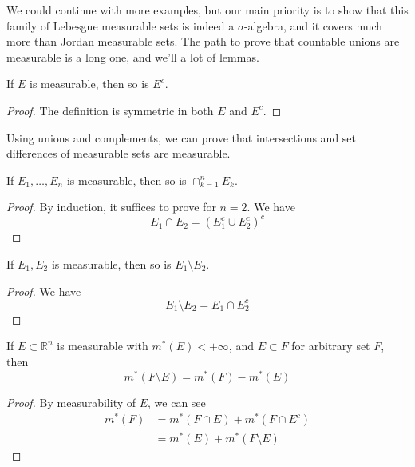   We could continue with more examples, but our main priority is to show that this family of Lebesgue measurable sets is indeed a $\sigma$-algebra, and it covers much more than Jordan measurable sets. The path to prove that countable unions are measurable is a long one, and we'll a lot of lemmas. 

  \begin{lemma}
    If $E$ is measurable, then so is $E^c$. 
  \end{lemma}
  \begin{proof}
    The definition is symmetric in both $E$ and $E^c$. 
  \end{proof}

  Using unions and complements, we can prove that intersections and set differences of measurable sets are measurable.  

  \begin{lemma}
    If $E_1, \ldots, E_n$ is measurable, then so is $\cap_{k=1}^n E_k$. 
  \end{lemma}
  \begin{proof}
    By induction, it suffices to prove for $n = 2$. We have 
    \begin{equation}
      E_1 \cap E_2 = (E_1^c \cup E_2^c)^c
    \end{equation}
  \end{proof}

  \begin{lemma}
    If $E_1, E_2$ is measurable, then so is $E_1 \setminus E_2$. 
  \end{lemma}
  \begin{proof}
    We have 
    \begin{equation}
      E_1 \setminus E_2 = E_1 \cap E_2^c
    \end{equation}
  \end{proof}

  \begin{lemma}
    If $E \subset \mathbb{R}^n$ is measurable with $m^\ast (E) < +\infty$, and $E \subset F$ for arbitrary set $F$, then 
    \begin{equation}
      m^\ast (F \setminus E) = m^\ast(F) - m^\ast(E)
    \end{equation}
  \end{lemma}
  \begin{proof}
    By measurability of $E$, we can see 
    \begin{align}
      m^\ast (F) & = m^\ast (F \cap E) + m^\ast (F \cap E^c) \\
                 & = m^\ast (E) + m^\ast (F \setminus E)
    \end{align}
  \end{proof}

